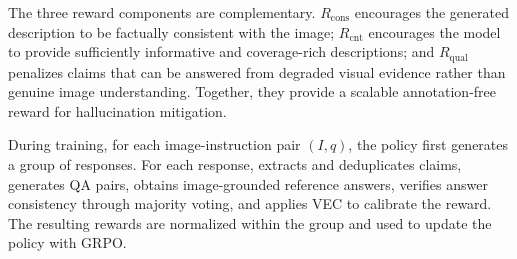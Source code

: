 The three reward components are complementary. $R_{\mathrm{cons}}$ encourages
the generated description to be factually consistent with the image;
$R_{\mathrm{cnt}}$ encourages the model to provide sufficiently informative and
coverage-rich descriptions; and $R_{\mathrm{qual}}$ penalizes claims that can be
answered from degraded visual evidence rather than genuine image understanding.
Together, they provide a scalable annotation-free reward for hallucination
mitigation.

During training, for each image-instruction pair $(I,q)$, the policy first
generates a group of responses. For each response, \ours extracts and
deduplicates claims, generates QA pairs, obtains image-grounded reference
answers, verifies answer consistency through majority voting, and applies VEC to
calibrate the reward. The resulting rewards are normalized within the group and
used to update the policy with GRPO.

